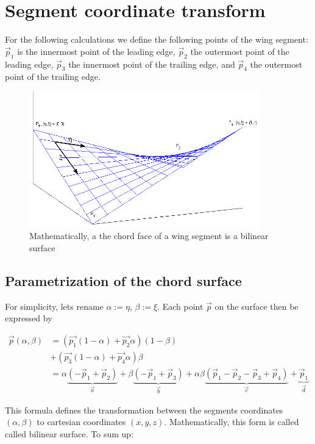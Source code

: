 \section{Segment coordinate transform}

For the following calculations we define the following points of the wing segment: $\vec p_1$ is the innermost point of the leading edge, $\vec p_2$ the outermost point of the leading edge, $\vec p_3$ the innermost point of the trailing edge, and $\vec p_4$ the outermost point of the trailing edge.

\begin{figure}[htb]
  \centering
  \includegraphics[width = 10cm]{gfx/bilinearSurface}
	\caption{Mathematically, a the chord face of a wing segment is a bilinear surface}
	\label{fig:bilin_surf}
\end{figure}

\subsection{Parametrization of the chord surface}

For simplicity, lets rename $\alpha := \eta$, $\beta := \xi$. Each point $\vec p$ on the surface then be expressed by

\begin{align}
\vec p(\alpha, \beta) &= \left( \vec {p_1} (1-\alpha) + \vec {p_2} \alpha \right) (1-\beta) \\
                  &+ \left( \vec {p_3} (1-\alpha) + \vec {p_4} \alpha \right) \beta \\
                  &= \alpha \underbrace{(-\vec p_1 + \vec p_2)}_{\vec a} + \beta\underbrace{(-\vec p_1 + \vec p_3)}_{\vec b} + \alpha \beta \underbrace{(\vec p_1 - \vec p_2 - \vec p_3 + \vec p_4)}_{\vec c} + \underbrace{\vec p_1}_{\vec d}
\label{eq:param}
\end{align}

This formula defines the transformation between the segments coordinates $(\alpha, \beta)$ to cartesian coordinates $(x, y, z)$. Mathematically, this form is called called bilinear surface. To sum up:

